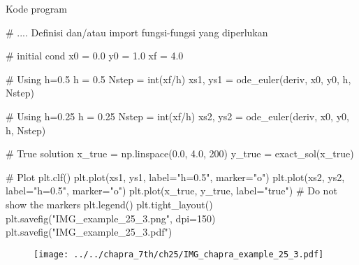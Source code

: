 Kode program
\begin{pythoncode}
# .... Definisi dan/atau import fungsi-fungsi yang diperlukan

# initial cond
x0 = 0.0
y0 = 1.0
xf = 4.0

# Using h=0.5
h = 0.5
Nstep = int(xf/h)
xs1, ys1 = ode_euler(deriv, x0, y0, h, Nstep)

# Using h=0.25
h = 0.25
Nstep = int(xf/h)
xs2, ys2 = ode_euler(deriv, x0, y0, h, Nstep)

# True solution
x_true = np.linspace(0.0, 4.0, 200)
y_true = exact_sol(x_true)

# Plot
plt.clf()
plt.plot(xs1, ys1, label="h=0.5", marker="o")
plt.plot(xs2, ys2, label="h=0.5", marker="o")
plt.plot(x_true, y_true, label="true") # Do not show the markers
plt.legend()
plt.tight_layout()
plt.savefig("IMG_example_25_3.png", dpi=150)
plt.savefig("IMG_example_25_3.pdf")
\end{pythoncode}

\begin{figure}[h]
{\centering
\texttt{[image: ../../chapra\_7th/ch25/IMG\_chapra\_example\_25\_3.pdf]}
\par}
\end{figure}

